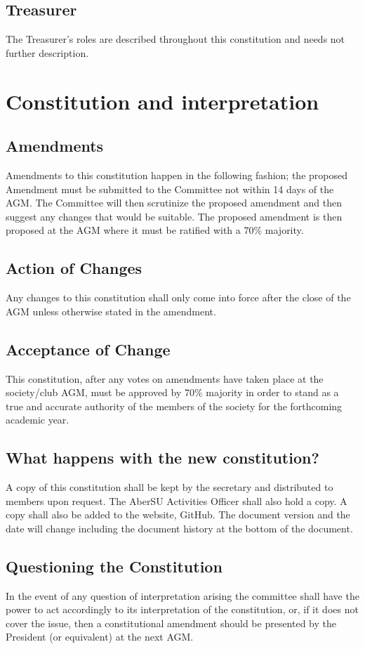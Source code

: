 \documentclass[a4paper,11pt]{article}
\begin{document}
\subsection{Treasurer}
The Treasurer's roles are described throughout this constitution and needs not further description.

\section{Constitution and interpretation}
\subsection{Amendments}
Amendments to this constitution happen in the following fashion; the proposed Amendment
must be submitted to the Committee not within 14 days of the AGM. The Committee will then scrutinize the proposed amendment and then suggest any changes that would be suitable. The proposed amendment is then proposed at the AGM where it must be ratified with a 70\% majority.

\subsection{Action of Changes}
Any changes to this constitution shall only come into force after the close of the AGM unless
otherwise stated in the amendment.

\subsection{Acceptance of Change}
This constitution, after any votes on amendments have taken place at the society/club AGM,
must be approved by 70\% majority in order to stand as a true and accurate authority of the members of the society for the forthcoming academic year.

\subsection{What happens with the new constitution?}
A copy of this constitution shall be kept by the secretary and distributed to members upon request. The AberSU Activities Officer shall also hold a copy. A copy shall also be added to the website, GitHub. The document version and the date will change including the document history at the bottom of the document.

\subsection{Questioning the Constitution}
In the event of any question of interpretation arising the committee shall have the power to act accordingly to its interpretation of the constitution, or, if it does not cover the issue, then a constitutional amendment should be presented by the President (or equivalent) at the next AGM.
\end{document}

